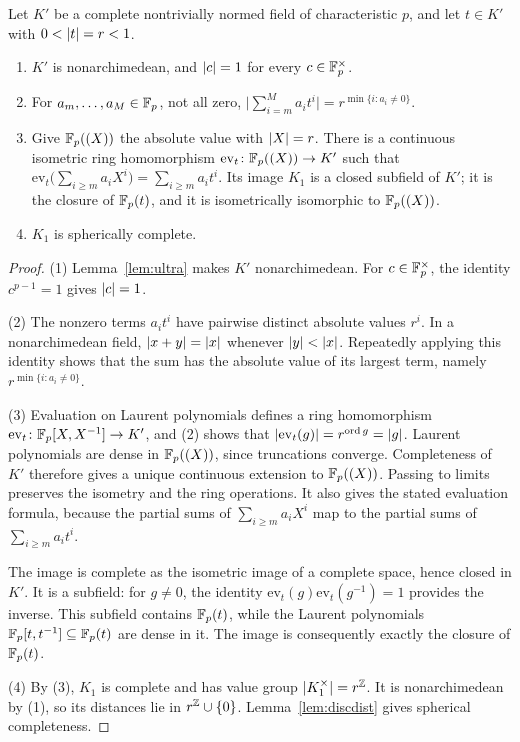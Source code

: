 \begin{lemma}\label{lem:laurentsub}
Let $K'$ be a complete nontrivially normed field of characteristic $p$, and let $t\in K'$ with $0<\lvert t\rvert=r<1$.
\begin{enumerate}
\item $K'$ is nonarchimedean, and $\lvert c\rvert=1$ for every $c\in\mathbb F_p^\times$.
\item For $a_m,\dots,a_M\in\mathbb F_p$, not all zero, $\bigl\lvert\sum_{i=m}^Ma_it^i\bigr\rvert=r^{\min\{i:a_i\ne0\}}$.
\item Give $\mathbb F_p((X))$ the absolute value with $\lvert X\rvert=r$. There is a continuous isometric ring homomorphism
$\mathrm{ev}_t\colon\mathbb F_p((X))\to K'$ such that
$\mathrm{ev}_t\bigl(\sum_{i\ge m}a_iX^i\bigr)=\sum_{i\ge m}a_it^i$. Its image
$K_1$ is a closed subfield of $K'$; it is the closure of $\mathbb F_p(t)$, and it is isometrically isomorphic to $\mathbb F_p((X))$.
\item $K_1$ is spherically complete.
\end{enumerate}
\end{lemma}

\begin{proof}
(1) Lemma~\ref{lem:ultra} makes $K'$ nonarchimedean. For $c\in\mathbb F_p^\times$, the identity $c^{p-1}=1$ gives $\lvert c\rvert=1$.

(2) The nonzero terms $a_it^i$ have pairwise distinct absolute values $r^i$. In a nonarchimedean field,
$\lvert x+y\rvert=\lvert x\rvert$ whenever $\lvert y\rvert<\lvert x\rvert$. Repeatedly applying this identity shows that the sum has the absolute
value of its largest term, namely $r^{\min\{i:a_i\ne0\}}$.

(3) Evaluation on Laurent polynomials defines a ring homomorphism
$\mathrm{ev}_t\colon\mathbb F_p[X,X^{-1}]\to K'$, and (2) shows that
$\lvert \mathrm{ev}_t(g)\rvert=r^{\operatorname{ord} g}=\lvert g\rvert$. Laurent polynomials are dense in $\mathbb F_p((X))$, since truncations converge.
Completeness of $K'$ therefore gives a unique continuous extension to $\mathbb F_p((X))$. Passing to limits preserves the
isometry and the ring operations. It also gives the stated evaluation formula, because the partial sums of
$\sum_{i\ge m}a_iX^i$ map to the partial sums of $\sum_{i\ge m}a_it^i$.

The image is complete as the isometric image of a complete space, hence closed in $K'$. It is a subfield: for
$g\ne0$, the identity $\mathrm{ev}_t(g)\mathrm{ev}_t(g^{-1})=1$ provides the inverse. This subfield contains
$\mathbb F_p(t)$, while the Laurent polynomials $\mathbb F_p[t,t^{-1}]\subseteq\mathbb F_p(t)$ are dense in it. The image is consequently
exactly the closure of $\mathbb F_p(t)$.

(4) By (3), $K_1$ is complete and has value group $\lvert K_1^\times\rvert=r^\mathbb Z$. It is nonarchimedean by (1), so its distances
lie in $r^\mathbb Z\cup\{0\}$. Lemma~\ref{lem:discdist} gives spherical completeness.
\end{proof}


